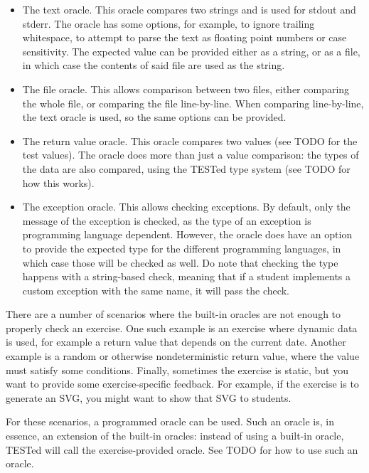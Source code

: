 \documentclass[../main]{subfiles}
\begin{document}
\begin{itemize}
    \item The text oracle.
          This oracle compares two strings and is used for stdout and stderr.
          The oracle has some options, for example, to ignore trailing whitespace, to attempt to parse the text as floating point numbers or case sensitivity.
          The expected value can be provided either as a string, or as a file, in which case the contents of said file are used as the string.
    \item The file oracle.
          This allows comparison between two files, either comparing the whole file, or comparing the file line-by-line.
          When comparing line-by-line, the text oracle is used, so the same options can be provided.
    \item The return value oracle.
          This oracle compares two values (see TODO for the test values).
          The oracle does more than just a value comparison: the types of the data are also compared, using the TESTed type system (see TODO for how this works).
    \item The exception oracle.
          This allows checking exceptions.
          By default, only the message of the exception is checked, as the type of an exception is programming language dependent.
          However, the oracle does have an option to provide the expected type for the different programming languages, in which case those will be checked as well.
          Do note that checking the type happens with a string-based check, meaning that if a student implements a custom exception with the same name, it will pass the check.
\end{itemize}

There are a number of scenarios where the built-in oracles are not enough to properly check an exercise.
One such example is an exercise where dynamic data is used, for example a return value that depends on the current date.
Another example is a random or otherwise nondeterministic return value, where the value must satisfy some conditions.
Finally, sometimes the exercise is static, but you want to provide some exercise-specific feedback.
For example, if the exercise is to generate an SVG, you might want to show that SVG to students.

For these scenarios, a programmed oracle can be used.
Such an oracle is, in essence, an extension of the built-in oracles: instead of using a built-in oracle, TESTed will call the exercise-provided oracle.
See TODO for how to use such an oracle.
\end{document}
